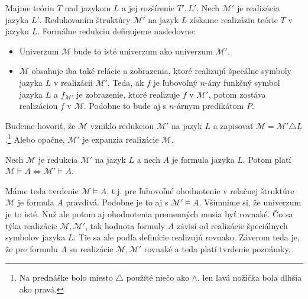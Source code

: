 \begin{definicia}[Redukcia]
    Majme teóriu $T$ nad jazykom $L$ a jej rozšírenie $T',L'$.
    Nech $\mathcal{M}'$ je realizácia jazyka $L'$.
    Redukovaním štruktúry $\mathcal{M}'$ na jazyk $L$
    získame realizáziu teórie $T$ v jazyku $L$.
    Formálne redukciu definujeme nasledovne:
    \begin{itemize}
    \item Univerzum $\mathcal{M}$ bude to isté univerzum ako univerzum
        $\mathcal{M}'$.

    \item $\mathcal{M}$ obsahuje iba také relácie a zobrazenia,
        ktoré realizujú špecálne symboly jazyka $L$ v realizácii
        $\mathcal{M}'$. Teda, ak $f$ je ľubovoľný $n$-ány funkčný
        symbol jazyka $L$ a $f_{\mathcal{M}'}$ je zobrazenie,
        ktoré realizuje $f$ v $\mathcal{M}'$,
        potom zostáva realizáciou $f$ v $\mathcal{M}$.
        Podobne to bude aj s $n$-árnym predikátom $P$.
    \end{itemize}
    
    Budeme hovoriť, že $\mathcal{M}$ vzniklo redukciou $\mathcal{M}'$ 
    na jazyk $L$ a zapisovať 
    $\mathcal{M} = \mathcal{M}' \triangle L$.\footnote{
        Na prednáške bolo miesto $\triangle$ použíté niečo ako $\land$,
        len ľavá nožička bola dlhšia ako pravá.}
    Alebo opačne, $\mathcal{M}'$ je expanzia realizácie $\mathcal{M}$.
\end{definicia}

\begin{poznamka}
    Nech $\mathcal{M}$ je redukcia $\mathcal{M}'$ na jazyk $L$
    a nech $A$ je formula jazyka $L$.
    Potom platí $\mathcal{M} \models A \iff \mathcal{M}' \models A$.
\end{poznamka}
\begin{dokaz}
    Máme teda tvrdenie $\mathcal{M} \models A$, t.j. pre ľubovoľné
    ohodnotenie v relačnej štruktúre $\mathcal{M}$ je formula $A$
    pravdivá. Podobne je to aj s $\mathcal{M}' \models A$.
    Všimnime si, že univerzum je to isté. Nuž ale potom aj ohodnotenia
    premenných musia byť rovnaké. Čo sa týka realizácie
    $\mathcal{M}, \mathcal{M}'$, tak hodnota formuly $A$ závisí
    od realizácie špeciálnych symbolov jazyka $L$. Tie sa ale podľa
    definície realizujú rovnako. Záverom teda je, že pre formulu
    $A$ su realizácie $\mathcal{M}, \mathcal{M'}$ rovnaké a teda platí
    tvrdenie poznámky.
    \\
\end{dokaz}

